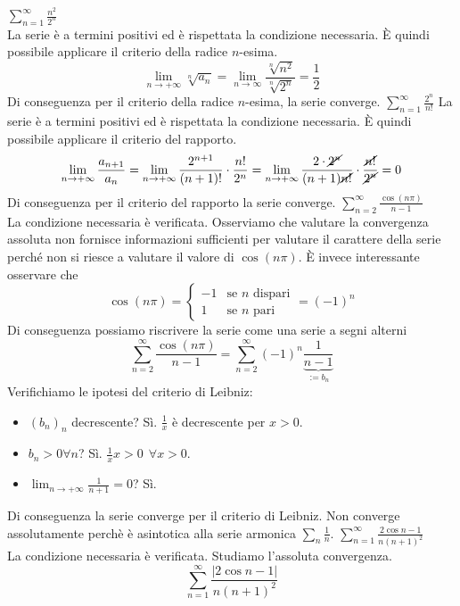 \documentclass{article}
\begin{document}
\begin{enumerate}[label=\textbf{Esercizio 9.\arabic*.},itemindent=*]
\begin{tasks}
        \task $\sum_{n=1}^\infty\frac{n^2}{2^n}$\\
        La serie è a termini positivi ed è rispettata la condizione necessaria. È quindi possibile applicare il criterio della radice $n$-esima.
        \[\lim_{n\to+\infty}\sqrt[n]{a_n}=\lim_{n\to\infty}\frac{\sqrt[n]{n^2}}{\sqrt[n]{2^n}}=\frac{1}{2}\]
        Di conseguenza per il criterio della radice $n$-esima, la serie converge.
        \task $\sum_{n=1}^\infty\frac{2^n}{n!}$
        La serie è a termini positivi ed è rispettata la condizione necessaria. È quindi possibile applicare il criterio del rapporto.
        \[\lim_{n\to+\infty}\frac{a_{n+1}}{a_n}=\lim_{n\to+\infty}\frac{2^{n+1}}{(n+1)!}\cdot\frac{n!}{2^n}=\lim_{n\to+\infty}\frac{2\cdot\cancel{2^n}}{(n+1)\cancel{n!}}\cdot\frac{\cancel{n!}}{\cancel{2^n}}=0\]
        Di conseguenza per il criterio del rapporto la serie converge.
        \task $\sum_{n=2}^\infty\frac{\cos(n\pi)}{n-1}$\\
        La condizione necessaria è verificata. Osserviamo che valutare la convergenza assoluta non fornisce informazioni sufficienti per valutare il carattere della serie perché non si riesce a valutare il valore di $\cos(n\pi)$. È invece interessante osservare che
        \[\cos(n\pi)=\begin{cases}
            -1&\text{se $n$ dispari}\\
            1&\text{se $n$ pari}
        \end{cases}=(-1)^n\]
        Di conseguenza possiamo riscrivere la serie come una serie a segni alterni
        \[\sum_{n=2}^\infty\frac{\cos(n\pi)}{n-1}=\sum_{n=2}^\infty(-1)^n\underbrace{\frac{1}{n-1}}_{:=b_n}\]
        Verifichiamo le ipotesi del criterio di Leibniz:
        \begin{itemize}
            \item $(b_n)_n$ decrescente? Sì. $\frac{1}{x}$ è decrescente per $x>0$.
            \item $b_n>0\forall n$? Sì. $\frac{1}{x} x>0~~\forall x>0$.
            \item $\lim_{n\to+\infty}\frac{1}{n+1}=0$? Sì.
        \end{itemize}
        Di conseguenza la serie converge per il criterio di Leibniz. Non converge assolutamente perchè è asintotica alla serie armonica $\scriptstyle \sum\limits_n\frac{1}{n}$.
        \task $\sum_{n=1}^\infty\frac{2\cos n-1}{n(n+1)^2}$
        \\La condizione necessaria è verificata. Studiamo l'assoluta convergenza. 
        \[\sum_{n=1}^\infty\frac{|2\cos n-1|}{n(n+1)^2}\]

\end{tasks}
\end{enumerate}
\end{document}
